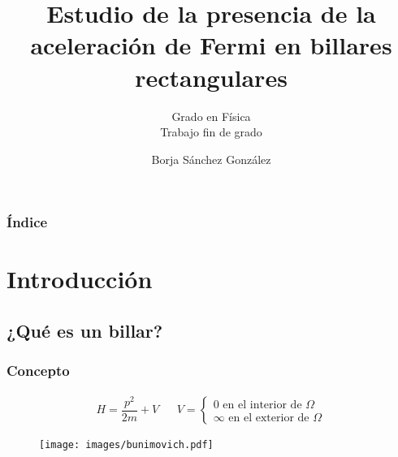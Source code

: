 \documentclass{beamer}
\title{Estudio de la presencia de la aceleración de Fermi en billares rectangulares}
\subtitle{Grado en Física\\[1mm]Trabajo fin de grado}
\author{Borja Sánchez González}
\institute{Universidad Nacional de Educación a Distancia}
\date{\empty}
\begin{document}
\begin{frame}
    \titlepage%
\end{frame}

\begin{frame}
    \frametitle{Índice}
    \tableofcontents
\end{frame}

\section{Introducción}

\subsection{¿Qué es un billar?}

%            
%    

\begin{frame}
    \frametitle[prueb1]{Concepto}
    \begin{align*}
        H = \dfrac{p^2}{2m} + V & & V = \begin{cases}
            0 \text{ en el interior de } \Omega \\
            \infty \text{ en el exterior de } \Omega
        \end{cases}
    \end{align*}
    \begin{figure}
        \centering
        \texttt{[image: images/bunimovich.pdf]}
    \end{figure}
\end{frame}
\end{document}
